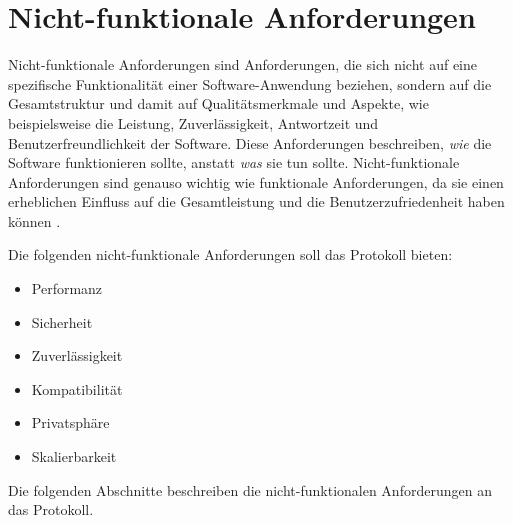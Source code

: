 \section{Nicht-funktionale Anforderungen}


Nicht-funktionale Anforderungen sind Anforderungen, die sich nicht auf eine 
spezifische Funktionalität einer Software-Anwendung beziehen, sondern auf die Gesamtstruktur und damit auf
Qualitätsmerkmale und Aspekte, wie beispielsweise die Leistung, Zuverlässigkeit, Antwortzeit und Benutzerfreundlichkeit 
der Software. 
Diese Anforderungen beschreiben, \textit{wie} die Software funktionieren sollte, anstatt \textit{was} sie tun sollte. 
Nicht-funktionale Anforderungen sind genauso wichtig wie funktionale Anforderungen, da sie einen 
erheblichen Einfluss auf die Gesamtleistung und die Benutzerzufriedenheit haben können
\parencite[S. 126-130]{Sommerville_AnfAnalyse}.

\noindent Die folgenden nicht-funktionale Anforderungen soll das Protokoll bieten:

\begin{itemize}
    \item Performanz
    \item Sicherheit
    \item Zuverlässigkeit
    \item Kompatibilität
    \item Privatsphäre
    \item Skalierbarkeit
\end{itemize}

\noindent Die folgenden Abschnitte beschreiben die nicht-funktionalen Anforderungen an das Protokoll.







